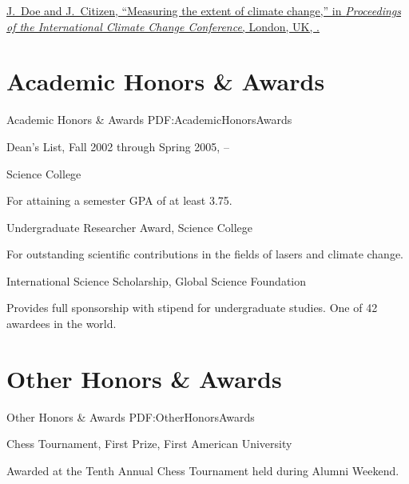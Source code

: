 \documentclass[a4paper,10pt,oneside]{article}
\begin{document}
\begin{body}
\EntryGap
\NumberedItem{{\CharSpace}[1]}
\href{http://www.example.com/my-paper-doi-1}
{\underline{J.~Doe} and J.~Citizen,
``Measuring the extent of climate change,''
in \textit{Proceedings of the International Climate Change Conference},
London, UK,
.}


\section
{Academic Honors\newline
\& Awards}
{Academic Honors \& Awards}
{PDF:AcademicHonorsAwards}

Dean's List,
Fall 2002 through Spring 2005,
\hfill
{} --
\par
Science College
\begin{detail}
For attaining a semester GPA of at least 3.75.
\end{detail}

\EntryGap
Undergraduate Researcher Award,
Science College
\hfill
{}
\begin{detail}
For outstanding scientific contributions in the fields of lasers and climate change.
\end{detail}

\EntryGap
International Science Scholarship,
Global Science Foundation
\hfill
{}
\begin{detail}
Provides full sponsorship with stipend for undergraduate studies.
One of 42 awardees in the world.
\end{detail}


\section
{Other Honors\newline
\& Awards}
{Other Honors \& Awards}
{PDF:OtherHonorsAwards}

Chess Tournament,
First Prize,
First American University
\hfill
{}
\begin{detail}
Awarded at the Tenth Annual Chess Tournament held during Alumni Weekend.
\end{detail}


\end{body}
\end{document}
